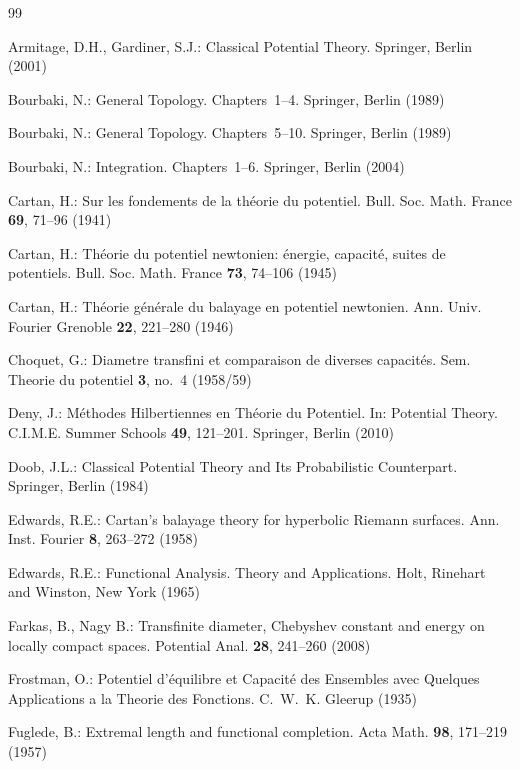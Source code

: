 \documentclass[12pt,a4paper,reqno]{amsart} %
\theoremstyle{lause}
\theoremstyle{maaritelma}
\theoremstyle{lause}
\theoremstyle{maaritelma}
\numberwithin{equation}{section}
\begin{document}
\begin{thebibliography}{99}

\setlength{\parskip}{1.2ex plus 0.5ex minus 0.2ex}

Armitage, D.H., Gardiner, S.J.: Classical Potential Theory. Springer, Berlin (2001)

Bourbaki, N.: General Topology. Chapters~1--4. Springer, Berlin (1989)

Bourbaki, N.: General Topology. Chapters~5--10. Springer, Berlin (1989)

 Bourbaki, N.: Integration. Chapters~1--6.
Springer, Berlin (2004)

 Cartan, H.: Sur les fondements de la th\'eorie du potentiel. Bull. Soc. Math. France {\bf 69}, 71--96 (1941)

 Cartan, H.: Th\'eorie du potentiel newtonien: \'energie, capacit\'e, suites de potentiels. Bull. Soc. Math. France {\bf 73}, 74--106 (1945)

 Cartan, H.: Th\'eorie g\'en\'erale du balayage en potentiel newtonien. Ann. Univ. Fourier Grenoble {\bf 22}, 221--280 (1946)

 Choquet, G.: Diametre transfini et comparaison de diverses capacit\'{e}s. Sem. Theorie du
potentiel {\bf 3}, no.~4 (1958/59)

 Deny, J.:  M\'ethodes Hilbertiennes en Th\'eorie du Potentiel. In: Potential Theory. C.I.M.E. Summer Schools {\bf 49}, 121--201. Springer, Berlin  (2010)

 Doob, J.L.: Classical Potential Theory and Its Probabilistic Counterpart. Springer, Berlin (1984)

 Edwards, R.E.: Cartan's balayage theory for hyperbolic Riemann surfaces. Ann. Inst. Fourier {\bf 8}, 263--272 (1958)

Edwards, R.E.: Functional Analysis. Theory and Applications. Holt,
Rinehart and Winston, New York (1965)

 Farkas, B., Nagy B.: Transfinite diameter, Chebyshev constant
and energy on locally compact spaces. Potential Anal. {\bf 28}, 241--260
(2008)

Frostman, O.: Potentiel d'\'{e}quilibre et Capacit\'{e} des Ensembles avec Quelques Applications a la Theorie des Fonctions. C.~W.~K. Gleerup (1935)

 Fuglede, B.: Extremal length and functional completion. Acta Math. {\bf 98}, 171--219 (1957)


\end{thebibliography}
\end{document}
